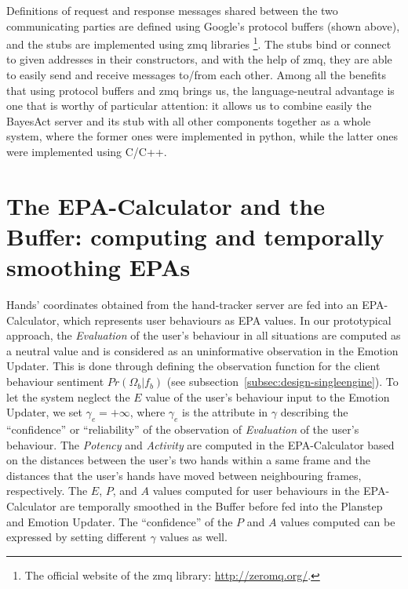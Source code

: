 Definitions of request and response messages shared between the two communicating parties are defined using Google's protocol buffers (shown above), and the stubs are implemented using zmq libraries \footnote{The official website of the zmq library: \url{http://zeromq.org/}.}. The stubs bind or connect to given addresses in their constructors, and with the help of zmq, they are able to easily send and receive messages to/from each other. Among all the benefits that using protocol buffers and zmq brings us, the language-neutral advantage is one that is worthy of particular attention: it allows us to combine easily the BayesAct server and its stub with all other components together as a whole system, where the former ones were implemented in python, while the latter ones were implemented using C/C++.


\section{The EPA-Calculator and the Buffer: computing and temporally smoothing EPAs}
\label{sec:impl-epacalc}

Hands' coordinates obtained from the hand-tracker server are fed into an EPA-Calculator, which represents user behaviours as EPA values. In our prototypical approach, the \textit{Evaluation} of the user's behaviour in all situations are computed as a neutral value and is considered as an uninformative observation in the Emotion Updater. This is done through defining the observation function for the client behaviour sentiment $Pr(\Omega_b|f_b)$ (see subsection~\ref{subsec:design-singleengine}). To let the system neglect the $E$ value of the user's behaviour input to the Emotion Updater, we set $\gamma_e = +\infty$, where $\gamma_e$ is the attribute in $\gamma$ describing the ``confidence'' or ``reliability'' of the observation of \textit{Evaluation} of the user's behaviour. The \textit{Potency} and \textit{Activity} are computed in the EPA-Calculator based on the distances between the user's two hands within a same frame and the distances that the user's hands have moved between neighbouring frames, respectively. The $E$, $P$, and $A$ values computed for user behaviours in the EPA-Calculator are temporally smoothed in the Buffer before fed into the Planstep and Emotion Updater. The ``confidence'' of the $P$ and $A$ values computed can be expressed by setting different $\gamma$ values as well.

